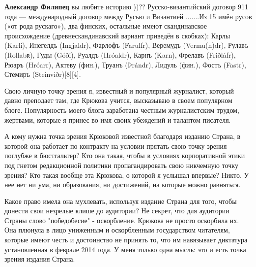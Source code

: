 \begin{itemize}
\begin{itemize}
 
\textbf{Александр Филипец} вы любите историю ))?? Русско-византийский договор 911 года — международный договор между Русью и Византией .......Из 15 имён русов («от рода рускаго»), два финских, остальные имеют скандинавское происхождение (древнескандинавский вариант приведён в скобках): Карлы (Karli), Инегелдъ (Ingjaldr), Фарлофъ (Farulfr), Веремудъ (Vermu(n)dr), Рулавъ (Rollabʀ), Гуды (Góði), Руалдъ (Hróaldr), Карнъ (Karn), Фрелавъ (Friðláfr), Рюаръ (Hróarr), Актеву (фин.), Труанъ (Þrándr), Лидуль (фин.), Фостъ (Fastr), Стемиръ (Steinviðr)[8][4].

\end{itemize}

 

Свою личную точку зрения я, известный и популярный журналист, который давно
преподает там, где Крюкова учится, высказываю в своем популярном блоге.
Популярность моего блога заработана честным журналистским трудом, жертвами,
которые я принес во имя своих убеждений и талантом писателя. 

А кому нужна точка зрения Крюковой известной благодаря изданию Страна, в
которой она работает по контракту на условии прятать свою точку зрения поглубже
в бюстгальтер? Кто она такая, чтобы в условиях корпоративной этики под гнетом
редакционной политики пропагандировать свою никчемную точку зрения? Кто такая
вообще эта Крюкова, о которой я услышал впервые? Никто. У нее нет ни ума, ни
образования, ни достижений, на которые можно равняться. 

Какое право имела она мухлевать, используя издание Страна для того, чтобы
донести свои незрелые клише до аудитории? Не секрет, что для аудитории Страны
слово "победобесие" - оскорбление. Крюкова не просто оскорбила их. Она плюнула
в лицо униженным и оскорбленным государством читателям, которые имеют честь и
достоинство не принять то, что им навязывает диктатура установленная в феврале
2014 года. У меня только одна мысль: это и есть точка зрения издания Страна.

\begin{itemize}
 

\end{itemize}
\end{itemize}
